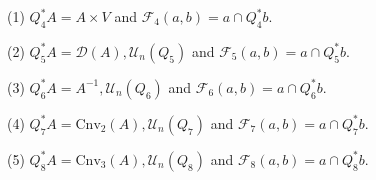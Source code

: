 (1) $Q_4^*A = A \times V$ and $\mathcal{F}_4(a, b) = a \cap Q_4^*b$.

(2) $Q_5^*A = \mathcal{D}(A), \mathcal{U}_n(Q_5)$ and $\mathcal{F}_5(a, b) = a \cap Q_5^*b$.

(3) $Q_6^*A = A^{-1}, \mathcal{U}_n(Q_6)$ and $\mathcal{F}_6(a, b) = a \cap Q_6^*b$.

(4) $Q_7^*A = \text{Cnv}_2(A), \mathcal{U}_n(Q_7)$ and $\mathcal{F}_7(a, b) = a \cap Q_7^*b$.

(5) $Q_8^*A = \text{Cnv}_3(A), \mathcal{U}_n(Q_8)$ and $\mathcal{F}_8(a, b) = a \cap Q_8^*b$.
